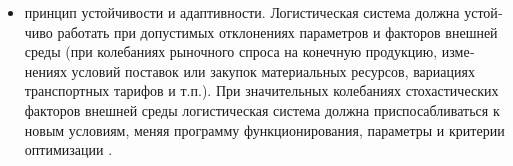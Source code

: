 \begin{itemize}
	\item принцип устойчивости и адаптивности.
	Логистическая система должна устой­чиво работать при допустимых отклоне­ниях параметров и факторов внешней среды (при колебаниях рыночного спроса на конечную продукцию, изме­нениях условий поставок или закупок материальных ресурсов, вариациях транспортных тарифов и т.п.).
	При зна­чительных колебаниях стохастических факторов внешней среды логистическая система должна приспосабливаться к	новым условиям, меняя программу функционирования, параметры и кри­терии оптимизации \cite[с. 19]{sergeev}.






\end{itemize}
